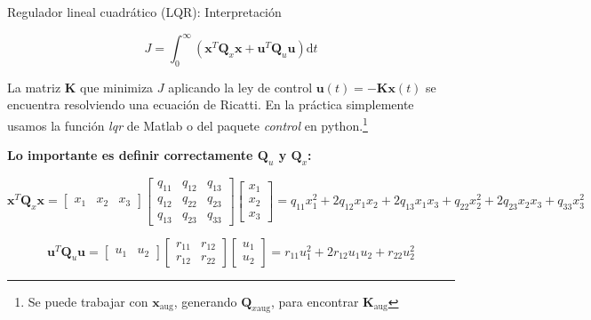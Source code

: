 \documentclass{beamer}
\begin{document}
\begin{frame}{Regulador lineal cuadrático (LQR): Interpretación}

\begin{equation}
J = \int_{0}^{\infty} \left( \mathbf{x}^T\mathbf{Q}_x\mathbf{x} + \mathbf{u}^T\mathbf{Q}_u\mathbf{u} \right) \mathrm{d}t
\label{eq:costo_quadratico}
\end{equation}

La matriz $\mathbf{K}$ que minimiza $J$ aplicando la ley de control $\mathbf{u}(t) = -\mathbf{K x}(t)$ se encuentra resolviendo una ecuación de Ricatti. En la práctica simplemente usamos la función \emph{lqr} de Matlab o del paquete \emph{control} en python.\footnote{Se puede trabajar con $\mathbf{x}_\text{aug}$, generando $\mathbf{Q}_{x\text{aug}}$, para encontrar $\mathbf{K}_\text{aug}$}

\textbf{Lo importante es definir correctamente $\mathbf{Q}_u$ y $\mathbf{Q}_x$:}

\begin{equation}
\mathbf{x}^T\mathbf{Q}_x\mathbf{x} = 
\begin{bmatrix} x_1 & x_2 & x_3 \end{bmatrix}
\begin{bmatrix} q_{11} & q_{12} & q_{13} \\ q_{12} & q_{22} & q_{23} \\ q_{13} & q_{23} & q_{33} \end{bmatrix}
\begin{bmatrix} x_1 \\ x_2 \\ x_3 \end{bmatrix} =
q_{11}x_1^2 + 2q_{12}x_1x_2 + 2q_{13}x_1x_3 + q_{22}x_2^2 + 2q_{23}x_2x_3 + q_{33}x_3^2
\end{equation}

\begin{equation}
\mathbf{u}^T\mathbf{Q}_u\mathbf{u} = 
\begin{bmatrix} u_1 & u_2 \end{bmatrix}
\begin{bmatrix} r_{11} & r_{12} \\ r_{12} & r_{22} \end{bmatrix}
\begin{bmatrix} u_1 \\ u_2 \end{bmatrix} =
r_{11}u_1^2 + 2r_{12}u_1u_2 + r_{22}u_2^2
\end{equation}

\end{frame}
\end{document}
